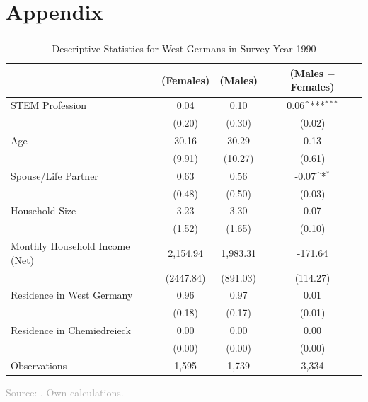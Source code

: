 \documentclass[11pt, aspectratio=1610, xcolor={dvipsnames}]{beamer}
\def\sym#1{\ifmmode^{#1}\else\(^{#1}\)\fi}
\begin{document}
	\section{Appendix}
	\begin{frame}
		\frametitle{}
		{\linespread{1}\tiny
			\begin{table}[h]
				\centering
				\caption{Descriptive Statistics for West Germans in Survey Year 1990}
				\label{tab:descriptiveswest}
				\begin{tabular}{l*{3}{c}}
					\toprule
					& (Females) & (Males) & (Males $-$ Females) \\
					\midrule
					STEM Profession     &        0.04&       0.10&         0.06\sym{***}\\
					&       (0.20)&       (0.30)&           (0.02)\\
					\addlinespace
					Age                 &       30.16&           30.29&          0.13         \\
					&        (9.91)&         (10.27)&             (0.61)\\
					\addlinespace
					Spouse/Life Partner &        0.63&            0.56&         -0.07\sym{*}  \\
					&         (0.48)&         (0.50)&        (0.03)\\
					\addlinespace
					Household Size      &        3.23&           3.30&         0.07        \\
					&       (1.52)&        (1.65)       &      (0.10)\\
					\addlinespace
					Monthly Household Income (Net)&     2,154.94&      1,983.31&       -171.64     \\
					&     (2447.84)&      (891.03)&    (114.27)\\
					\addlinespace
					Residence in West Germany&        0.96&         0.97&            0.01      \\
					&       (0.18)&        (0.17)&         (0.01)\\
					\addlinespace
					Residence in Chemiedreieck&        0.00&            0.00&            0.00       \\
					&           (0.00)&          (0.00)&         (0.00)\\
					\midrule
					Observations        &        1,595&             1,739&            3,334               \\
					\bottomrule
				\end{tabular}
			\end{table}
		}
		
		{\scriptsize
			\textcolor{darkgray}{Source: \cite{SOEP2023}. Own calculations.}
		}
		
	\end{frame}
	
\end{document}
